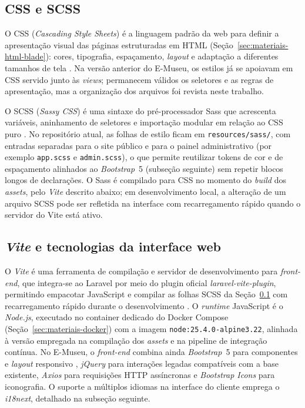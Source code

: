 \subsection{CSS e SCSS}\label{sec:materiais-css-scss}

O CSS (\textit{Cascading Style Sheets}) é a linguagem padrão da web para definir a apresentação visual das páginas estruturadas em HTML (Seção~\ref{sec:materiais-html-blade}): cores, tipografia, espaçamento, \textit{layout} e adaptação a diferentes tamanhos de tela \cite{css}. Na versão anterior do E-Museu, os estilos já se apoiavam em CSS servido junto às \textit{views}; permanecem válidos os seletores e as regras de apresentação, mas a organização dos arquivos foi revista neste trabalho.

O SCSS (\textit{Sassy CSS}) é uma sintaxe do pré-processador Sass que acrescenta variáveis, aninhamento de seletores e importação modular em relação ao CSS puro \cite{sass}. No repositório atual, as folhas de estilo ficam em \texttt{resources/sass/}, com entradas separadas para o site público e para o painel administrativo (por exemplo \texttt{app.scss} e \texttt{admin.scss}), o que permite reutilizar tokens de cor e de espaçamento alinhados ao \textit{Bootstrap}~5 (subseção seguinte) sem repetir blocos longos de declarações. O Sass é compilado para CSS no momento do \textit{build} dos \textit{assets}, pelo \textit{Vite} descrito abaixo; em desenvolvimento local, a alteração de um arquivo SCSS pode ser refletida na interface com recarregamento rápido quando o servidor do Vite está ativo.


\subsection{\textit{Vite} e tecnologias da interface web}\label{sec:materiais-vite}

O \textit{Vite} é uma ferramenta de compilação e servidor de desenvolvimento para \textit{front-end}, que integra-se ao Laravel por meio do plugin oficial \textit{laravel-vite-plugin}, permitindo empacotar JavaScript e compilar as folhas SCSS da Seção~\ref{sec:materiais-css-scss} com recarregamento rápido durante o desenvolvimento \cite{vite,nodejs}. O \textit{runtime} JavaScript é o \textit{Node.js}, executado no container dedicado do Docker Compose (Seção~\ref{sec:materiais-docker}) com a imagem \texttt{node:25.4.0-alpine3.22}, alinhada à versão empregada na compilação dos \textit{assets} e na pipeline de integração contínua. No E-Museu, o \textit{front-end} combina ainda \textit{Bootstrap}~5 para componentes e \textit{layout} responsivo \cite{bootstrap}, \textit{jQuery} para interações legadas compatíveis com a base existente, \textit{Axios} para requisições HTTP assíncronas e \textit{Bootstrap Icons} para iconografia. O suporte a múltiplos idiomas na interface do cliente emprega o \textit{i18next}, detalhado na subseção seguinte.


